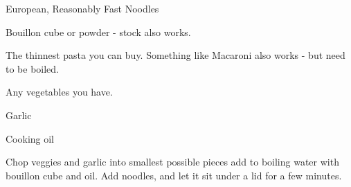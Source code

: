 \begin{recipe}{European, Reasonably Fast Noodles}
    \begin{ingr}[1]
    \item Bouillon cube or powder - stock also works.
    \item The thinnest pasta you can buy. Something like Macaroni also works
        - but need to be boiled.
    \item Any vegetables you have.
    \item Garlic
    \item Cooking oil
    \end{ingr}

    Chop veggies and garlic into smallest possible pieces add to
    boiling water with
    bouillon cube and oil. Add noodles, and let it sit under a lid for
    a few minutes.
\end{recipe}
